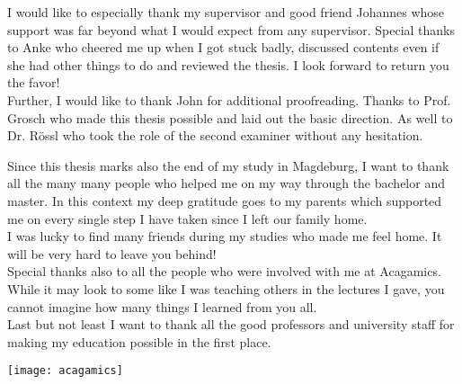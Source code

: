 \documentclass[thesis.tex]{subfiles}
\begin{document}
\label{chap:Acknowledgments}

I would like to especially thank my supervisor and good friend Johannes whose support was far beyond what I would expect from any supervisor.
Special thanks to Anke who cheered me up when I got stuck badly, discussed contents even if she had other things to do and reviewed the thesis.
I look forward to return you the favor!
\\
Further, I would like to thank John for additional proofreading.
Thanks to Prof. Grosch who made this thesis possible and laid out the basic direction.
As well to Dr. Rössl who took the role of the second examiner without any hesitation.

Since this thesis marks also the end of my study in Magdeburg, I want to thank all the many many people who helped me on my way through the bachelor and master.
In this context my deep gratitude goes to my parents which supported me on every single step I have taken since I left our family home.
\\
I was lucky to find many friends during my studies who made me feel home.
It will be very hard to leave you behind!
\\
Special thanks also to all the people who were involved with me at Acagamics.
While it may look to some like I was teaching others in the lectures I gave, you cannot imagine how many things I learned from you all.
\\
Last but not least I want to thank all the good professors and university staff for making my education possible in the first place.

\begin{figure*}
\centering
\texttt{[image: acagamics]}
\end{figure*}

\newpage
\end{document}
